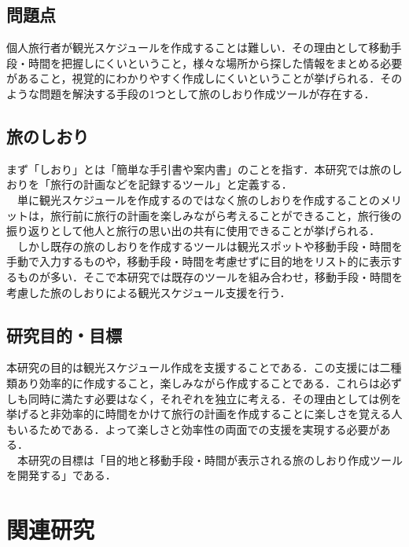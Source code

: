 \documentclass{funthesis}
\begin{document}
\section{問題点} %

個人旅行者が観光スケジュールを作成することは難しい．その理由として移動手段・時間を把握しにくいということ，様々な場所から探した情報をまとめる必要があること，視覚的にわかりやすく作成しにくいということが挙げられる．そのような問題を解決する手段の1つとして旅のしおり作成ツールが存在する．\\



\section{旅のしおり}
まず「しおり」とは「簡単な手引書や案内書」のことを指す．本研究では旅のしおりを「旅行の計画などを記録するツール」と定義する．\\
　単に観光スケジュールを作成するのではなく旅のしおりを作成することのメリットは，旅行前に旅行の計画を楽しみながら考えることができること，旅行後の振り返りとして他人と旅行の思い出の共有に使用できることが挙げられる．\\
　しかし既存の旅のしおりを作成するツールは観光スポットや移動手段・時間を手動で入力するものや，移動手段・時間を考慮せずに目的地をリスト的に表示するものが多い．そこで本研究では既存のツールを組み合わせ，移動手段・時間を考慮した旅のしおりによる観光スケジュール支援を行う．


\section{研究目的・目標}

本研究の目的は観光スケジュール作成を支援することである．この支援には二種類あり効率的に作成すること，楽しみながら作成することである．これらは必ずしも同時に満たす必要はなく，それぞれを独立に考える．その理由としては例を挙げると非効率的に時間をかけて旅行の計画を作成することに楽しさを覚える人もいるためである．よって楽しさと効率性の両面での支援を実現する必要がある．\\
　本研究の目標は「目的地と移動手段・時間が表示される旅のしおり作成ツールを開発する」である．%


\chapter{関連研究}%
\end{document}
